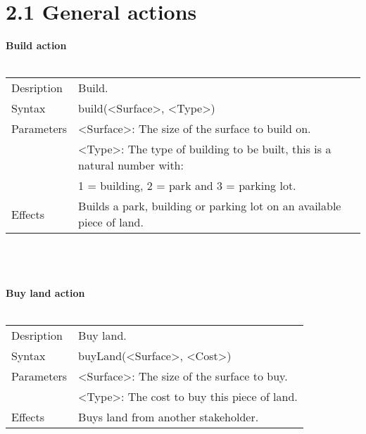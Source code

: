 \documentclass[english,11pt]{report}
\begin{document}
\newpage
\section*{2.1 General actions}

\textbf{Build action}\\
\\
\begin{tabularx}{\textwidth}{lX}
 Desription & Build. \\
 Syntax & build(<Surface>, <Type>) \\
 Parameters & <Surface>: The size of the surface to build on.\\
            & <Type>: The type of building to be built, this is a natural number with: \\
            &      1 = building, 2 = park and 3 = parking lot.\\
 Effects &  Builds a park, building or parking lot on an available piece of land.
\end{tabularx}\\
\\
\\
\textbf{Buy land action}\\
\\
\begin{tabularx}{\textwidth}{lX}
 Desription & Buy land. \\
 Syntax & buyLand(<Surface>, <Cost>) \\
 Parameters & <Surface>: The size of the surface to buy.\\
            & <Type>: The cost to buy this piece of land.\\
 Effects &  Buys land from another stakeholder.
\end{tabularx}
\end{document}
